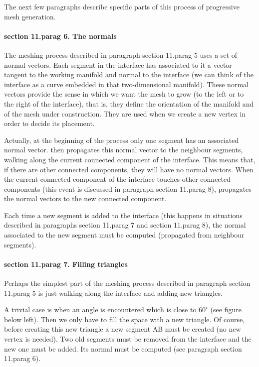 The next few paragraphs describe specific parts of this process of progressive mesh generation.


\paragraph{\numb section 11.\numb parag 6. The normals}

The meshing process described in paragraph \numb section 11.\numb parag 5 uses a set of
normal vectors.
Each segment in the interface has associated to it
a vector tangent to the working manifold and normal to the interface (we can
think of the interface as a curve embedded in that two-dimensional manifold).
These normal vectors provide the sense in which we want the mesh to grow (to the left or to
the right of the interface), that is, they define the orientation of the manifold and of
the mesh under construction.
They are used when we create a new vertex in order to decide its placement.

Actually, at the beginning of the process only one segment has an associated normal vector.
{\ManiFEM} then propagates this normal vector to the neighbour segments, walking along
the current connected component of the interface.
This means that, if there are other connected components, they will have no normal vectors.
When the current connected component of the interface touches other connected components
(this event is discussed in paragraph \numb section 11.\numb parag 8), {\maniFEM}
propagates the normal vectors to the new connected component.

Each time a new segment is added to the interface (this happens in situations described in
paragraphs \numb section 11.\numb parag 7 and \numb section 11.\numb parag 8),
the normal associated to the new segment must be computed (propagated from neighbour
segments).


\paragraph{\numb section 11.\numb parag 7. Filling triangles}

Perhaps the simplest part of the meshing process described in paragraph
\numb section 11.\numb parag 5 is just walking along the interface and adding new triangles.

A trivial case is when an angle is encountered which is close to $ 60^\circ $
(see figure below left).
Then we only have to fill the space with a new triangle.
Of course, before creating this new triangle a new segment {\codett AB} must be created
(no new vertex is needed).
Two old segments must be removed from the interface and the new one must be added.
Its normal must be computed (see paragraph \numb section 11.\numb parag 6).

